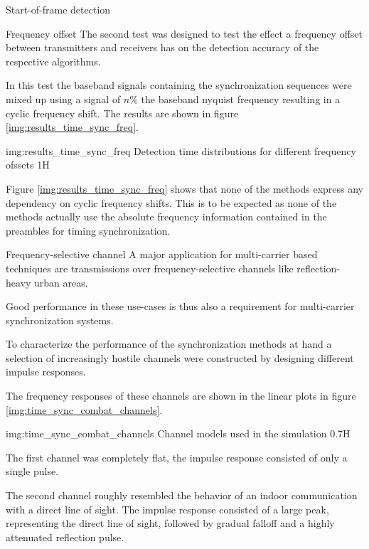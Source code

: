 \begin{subchapter}{Start-of-frame detection}
  \begin{subsubchapter}{Frequency offset}
    The second test was designed to test the effect a frequency offset
    between transmitters and receivers has on the detection accuracy
    of the respective algorithms.

    In this test the baseband signals containing the synchronization
    sequences were mixed up using a signal of $n\si{\percent}$ the
    baseband nyquist frequency resulting in a cyclic frequency shift.
    The results are shown in figure \ref{img:results_time_sync_freq}.

                 {img:results_time_sync_freq}
                 {Detection time distributions for different frequency ofssets}
                 {1}{H}

    Figure \ref{img:results_time_sync_freq} shows that none of the
    methods express any dependency on cyclic frequency shifts.
    This is to be expected as none of the methods actually use
    the absolute frequency information contained in the preambles
    for timing synchronization.
  \end{subsubchapter}

  \begin{subsubchapter}{Frequency-selective channel}
    A major application for multi-carrier based techniques
    are transmissions over frequency-selective channels
    like reflection-heavy urban areas.

    Good performance in these use-cases is thus also a
    requirement for multi-carrier synchronization systems.

    To characterize the performance of the synchronization
    methods at hand a selection of increasingly hostile
    channels were constructed by designing different
    impulse responses.

    The frequency responses of these channels are shown
    in the linear plots in figure \ref{img:time_sync_combat_channels}.

                 {img:time_sync_combat_channels}
                 {Channel models used in the simulation}
                 {0.7}{H}

    The first channel was completely flat, the impulse response
    consisted of only a single pulse.

    The second channel roughly resembled the behavior of
    an indoor communication with a direct line of sight.
    The impulse response consisted of a large peak, representing the
    direct line of sight, followed by gradual falloff and a
    highly attenuated reflection pulse.


\end{subsubchapter}
\end{subchapter}
